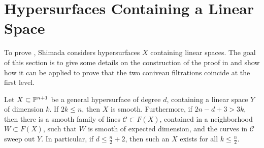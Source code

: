 \section{Hypersurfaces Containing a Linear Space}
\label{sec:Linear}
To prove \cite[Theorem 2-ii]{ShimadaHypersurfaces}, Shimada considers hypersurfaces $X$ containing linear spaces. The goal of this section is to give some details on the construction of the proof in \cite[Theorem 2-ii]{ShimadaHypersurfaces} and show how it can be applied to prove that the two coniveau filtrations coincide at the first level.
\begin{proposition}
	\label{prop:LinearSpaceSmooth}
	Let $X \subset \P^{n+1}$ be a general hypersurface of degree $d$, containing a linear space $Y$ of dimension $k$. If $2k \leq n$, then $X$ is smooth. Furthermore, if  $2n-d+3 > 3k$, then there is a smooth family of lines $\mathcal{C} \subset F(X)$, contained in a neighborhood $W \subset F(X)$, such that $W$ is smooth of expected dimension, and the curves in $\mathcal{C}$ sweep out $Y$. In particular, if $d \leq \frac{n}{2}+2$, then such an $X$ exists for all $k \leq \frac{n}{2}$. 
\end{proposition}
